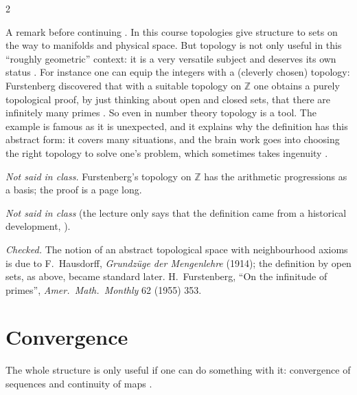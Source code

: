 \begin{paracol}{2}
\begin{secondary}
A remark before continuing . In this course topologies give structure to sets on the way to
manifolds and physical space. But topology is not only useful in this ``roughly geometric'' context: it is a very versatile
subject and deserves its own status . For instance one can equip the integers with a (cleverly
chosen) topology: Furstenberg discovered that with a suitable topology on $\mathbb Z$ one obtains a purely topological proof, by
just thinking about open and closed sets, that there are infinitely many primes . So
even in number theory topology is a tool. The example is famous as it is unexpected, and it explains why the definition has this
abstract form: it covers many situations, and the brain work goes into choosing the right topology to solve one's
problem, which sometimes takes ingenuity .\par
\smallskip
\emph{Not said in class.} Furstenberg's topology on $\mathbb Z$ has the arithmetic progressions as a basis; the proof is a
page long.
\end{secondary}
\begin{history}
\emph{Not said in class} (the lecture only says that the definition came from a historical development, ).\par
\smallskip
\emph{Checked.} The notion of an abstract topological space with neighbourhood axioms is due to F.~Hausdorff,
\emph{Grundz\"uge der Mengenlehre} (1914); the definition by open sets, as above, became standard later. H.~Furstenberg,
``On the infinitude of primes'', \emph{Amer.\ Math.\ Monthly} 62 (1955) 353.
\end{history}

\section{Convergence}\label{sec:to-conv}

The whole structure is only useful if one can do something with it: convergence of sequences and continuity of maps
.


\end{paracol}
